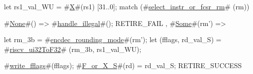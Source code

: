 let rs1_val_WU = #\hyperref[sailRISCVzX]{X}#(rs1) [31..0];
match (#\hyperref[sailRISCVzselectzyinstrzyorzyfcsrzyrm]{select\_instr\_or\_fcsr\_rm}# (rm)) {
  #\hyperref[sailRISCVzNone]{None}#() => { #\hyperref[sailRISCVzhandlezyillegal]{handle\_illegal}#(); RETIRE_FAIL },
  #\hyperref[sailRISCVzSome]{Some}#(rm') => {
    let rm_3b = #\hyperref[sailRISCVzencdeczyroundingzymode]{encdec\_rounding\_mode}#(rm');
    let (fflags, rd_val_S) = #\hyperref[sailRISCVzriscvzyui32ToF32]{riscv\_ui32ToF32}# (rm_3b, rs1_val_WU);

    #\hyperref[sailRISCVzwritezyfflags]{write\_fflags}#(fflags);
    #\hyperref[sailRISCVzFzyorzyXzyS]{F\_or\_X\_S}#(rd) = rd_val_S;
    RETIRE_SUCCESS
  }
}
